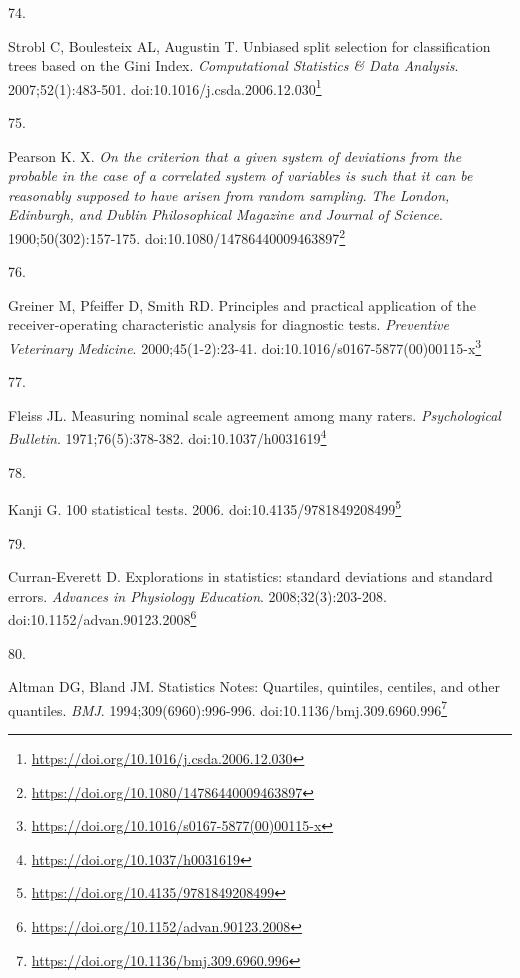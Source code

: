 \documentclass[
  a4paper,
]{book}
\newlength{\cslhangindent}
\newlength{\csllabelwidth}
\newlength{\cslentryspacingunit} %
\newenvironment{CSLReferences}[2] %
 {%
  \setlength{\parindent}{0pt}
  \ifodd #1
  \let\oldpar\par
  \def\par{\hangindent=\cslhangindent\oldpar}
  \fi
  \setlength{\parskip}{#2\cslentryspacingunit}
 }%
 {}
\newcommand{\CSLLeftMargin}[1]{\parbox[t]{\csllabelwidth}{#1}}
\newcommand{\CSLRightInline}[1]{\parbox[t]{\linewidth - \csllabelwidth}{#1}\break}
\renewcommand{\href}[2]{#2\footnote{\url{#1}}}
\begin{document}
\begin{CSLReferences}{0}{0}
\leavevmode{}%
\CSLLeftMargin{74. }%
\CSLRightInline{Strobl C, Boulesteix AL, Augustin T. Unbiased split selection for classification trees based on the Gini Index. \emph{Computational Statistics \& Data Analysis}. 2007;52(1):483-501. doi:\href{https://doi.org/10.1016/j.csda.2006.12.030}{10.1016/j.csda.2006.12.030}}

\leavevmode{}%
\CSLLeftMargin{75. }%
\CSLRightInline{Pearson K. X. {\emph{On the criterion that a given system of deviations from the probable in the case of a correlated system of variables is such that it can be reasonably supposed to have arisen from random sampling}}. \emph{The London, Edinburgh, and Dublin Philosophical Magazine and Journal of Science}. 1900;50(302):157-175. doi:\href{https://doi.org/10.1080/14786440009463897}{10.1080/14786440009463897}}

\leavevmode{}%
\CSLLeftMargin{76. }%
\CSLRightInline{Greiner M, Pfeiffer D, Smith RD. Principles and practical application of the receiver-operating characteristic analysis for diagnostic tests. \emph{Preventive Veterinary Medicine}. 2000;45(1-2):23-41. doi:\href{https://doi.org/10.1016/s0167-5877(00)00115-x}{10.1016/s0167-5877(00)00115-x}}

\leavevmode{}%
\CSLLeftMargin{77. }%
\CSLRightInline{Fleiss JL. Measuring nominal scale agreement among many raters. \emph{Psychological Bulletin}. 1971;76(5):378-382. doi:\href{https://doi.org/10.1037/h0031619}{10.1037/h0031619}}

\leavevmode{}%
\CSLLeftMargin{78. }%
\CSLRightInline{Kanji G. 100 statistical tests. 2006. doi:\href{https://doi.org/10.4135/9781849208499}{10.4135/9781849208499}}

\leavevmode{}%
\CSLLeftMargin{79. }%
\CSLRightInline{Curran-Everett D. Explorations in statistics: standard deviations and standard errors. \emph{Advances in Physiology Education}. 2008;32(3):203-208. doi:\href{https://doi.org/10.1152/advan.90123.2008}{10.1152/advan.90123.2008}}

\leavevmode{}%
\CSLLeftMargin{80. }%
\CSLRightInline{Altman DG, Bland JM. Statistics Notes: Quartiles, quintiles, centiles, and other quantiles. \emph{BMJ}. 1994;309(6960):996-996. doi:\href{https://doi.org/10.1136/bmj.309.6960.996}{10.1136/bmj.309.6960.996}}


\end{CSLReferences}
\end{document}
